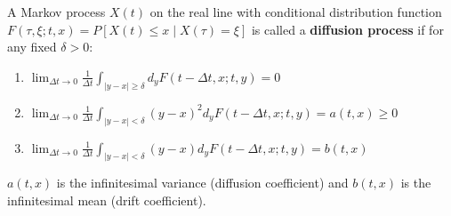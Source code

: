 A Markov process $X(t)$ on the real line with conditional distribution function $F(\tau, \xi; t, x) = P[X(t) \leq x \mid X(\tau) = \xi]$ is called a \textbf{diffusion process} if for any fixed $\delta > 0$:
\begin{enumerate}
\item $\lim_{\Delta t \to 0} \frac{1}{\Delta t} \int_{|y-x| \geq \delta} d_y F(t-\Delta t, x; t, y) = 0$
\item $\lim_{\Delta t \to 0} \frac{1}{\Delta t} \int_{|y-x| < \delta} (y - x)^2 d_y F(t-\Delta t, x; t, y) = a(t, x) \geq 0$
\item $\lim_{\Delta t \to 0} \frac{1}{\Delta t} \int_{|y-x| < \delta} (y - x) d_y F(t-\Delta t, x; t, y) = b(t, x)$
\end{enumerate}

$a(t, x)$ is the infinitesimal variance (diffusion coefficient) and $b(t, x)$ is the infinitesimal mean (drift coefficient).
